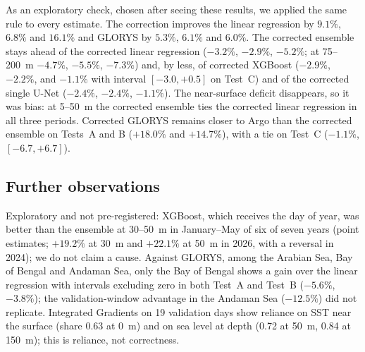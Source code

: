 As an exploratory check, chosen after seeing these results, we applied the same rule to every estimate. The correction improves the linear regression by $9.1\%$, $6.8\%$ and $16.1\%$ and GLORYS by $5.3\%$, $6.1\%$ and $6.0\%$. The corrected ensemble stays ahead of the corrected linear regression ($-3.2\%$, $-2.9\%$, $-5.2\%$; at 75--200~m $-4.7\%$, $-5.5\%$, $-7.3\%$) and, by less, of corrected XGBoost ($-2.9\%$, $-2.2\%$, and $-1.1\%$ with interval $[-3.0,+0.5]$ on Test~C) and of the corrected single U-Net ($-2.4\%$, $-2.4\%$, $-1.1\%$). The near-surface deficit disappears, so it was bias: at 5--50~m the corrected ensemble ties the corrected linear regression in all three periods. Corrected GLORYS remains closer to Argo than the corrected ensemble on Tests~A and B ($+18.0\%$ and $+14.7\%$), with a tie on Test~C ($-1.1\%$, $[-6.7,+6.7]$).

\subsection{Further observations}
Exploratory and not pre-registered: XGBoost, which receives the day of year, was better than the ensemble at 30--50~m in January--May of six of seven years (point estimates; $+19.2\%$ at 30~m and $+22.1\%$ at 50~m in 2026, with a reversal in 2024); we do not claim a cause. Against GLORYS, among the Arabian Sea, Bay of Bengal and Andaman Sea, only the Bay of Bengal shows a gain over the linear regression with intervals excluding zero in both Test~A and Test~B ($-5.6\%$, $-3.8\%$); the validation-window advantage in the Andaman Sea ($-12.5\%$) did not replicate. Integrated Gradients \cite{ig} on 19 validation days show reliance on SST near the surface (share 0.63 at 0~m) and on sea level at depth (0.72 at 50~m, 0.84 at 150~m); this is reliance, not correctness.
